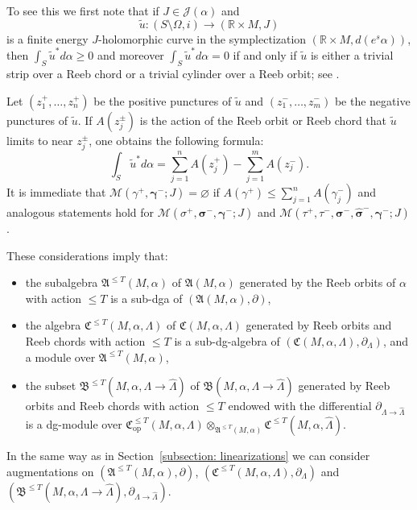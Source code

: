 \documentclass[10pt]{amsart}
\let\mathcal\mathscr
\let\ra\rightarrow
\newcommand{\opp}{\mathrm{op}}
\theoremstyle{plain}
\theoremstyle{definition}
\numberwithin{equation}{subsection}
\newcommand{\bdry}{\partial}
\let\bs\boldsymbol
\begin{document}
To see this we first note that if $J\in \mathcal{J}(\alpha)$ and
$$\widetilde{u}: (S\setminus \Omega,i) \to (\mathbb{R}\times M,J)$$
is a finite energy $J$-holomorphic curve in the symplectization $(\mathbb{R}\times M,d (e^s\alpha))$, then $\int_{S} \widetilde{u}^* d\alpha \geq 0$ and moreover $\int_{S} \widetilde{u}^* d\alpha=0$ if and only if $\widetilde{u}$ is either a trivial strip over a Reeb chord or a trivial cylinder over a Reeb orbit; see \cite{Ab,H}.

Let $(z^+_1,\dots,z^+_n)$ be the positive punctures of $\widetilde{u}$ and $(z^-_1,\dots,z^-_m)$ be the negative punctures of $\widetilde{u}$. If $A(z^{\pm}_j)$ is the action of the Reeb orbit or Reeb chord that $\widetilde{u}$ limits to near $z^{\pm}_j$, one obtains the following formula:
\begin{equation}
\int_{S} \widetilde{u}^* d\alpha = \sum_{j=1}^{n}A(z^{+}_j) - \sum_{j=1}^{m}A(z^{-}_j).
\end{equation}
It is immediate that $\mathcal{M}(\gamma^+,\bs\gamma^-;J)=\varnothing$ if $A(\gamma^+) \leq \sum_{j=1}^{n} A(\gamma^-_j) $ and analogous statements hold for ${\mathcal{M}}(\sigma^+,\bs\sigma^-,\bs\gamma^-;J)$ and ${\mathcal{M}}(\tau^+,\tau^-,\bs\sigma^-,\widehat{\bs\sigma}^-,\bs\gamma^-;J)$.

These considerations imply that:
\begin{itemize}
\item the subalgebra $\mathfrak{A}^{\leq T}(M,\alpha)$ of $\mathfrak{A}(M,\alpha)$ generated by the Reeb orbits of $\alpha$ with action $\leq T$ is a sub-dga of $(\mathfrak{A}(M,\alpha),\bdry)$,
\item the algebra $\mathfrak{C}^{\leq T}(M,\alpha,\Lambda)$ of $\mathfrak{C}(M,\alpha,\Lambda)$ generated by Reeb orbits and Reeb chords with action $\leq T$ is a sub-dg-algebra of $(\mathfrak{C}(M,\alpha,\Lambda),\partial_{\Lambda})$, and a module over $\mathfrak{A}^{\leq T}(M,\alpha)$,
\item the subset $\mathfrak{B}^{\leq T}(M,\alpha,\Lambda\ra \widehat{\Lambda})$ of $\mathfrak{B}(M,\alpha,\Lambda\ra \widehat{\Lambda})$ generated by Reeb orbits and Reeb chords with action $\leq T$ endowed with the differential $\partial_{\Lambda\ra \widehat{\Lambda}}$ is a dg-module over $\mathfrak{C}_{\opp}^{\leq T}(M,\alpha,\Lambda) \otimes_{\mathfrak{A}^{\leq T}(M,\alpha)} \mathfrak{C}^{\leq T}(M,\alpha,\widehat{\Lambda})$.
\end{itemize}

In the same way as in Section~\ref{subsection: linearizations} we can consider augmentations on $(\mathfrak{A}^{\leq T}(M,\alpha),\bdry)$, $(\mathfrak{C}^{\leq T}(M,\alpha,\Lambda),\partial_{\Lambda})$ and $(\mathfrak{B}^{\leq T}(M,\alpha,\Lambda\ra \widehat{\Lambda}),\partial_{\Lambda\ra \widehat{\Lambda}})$.
\end{document}

